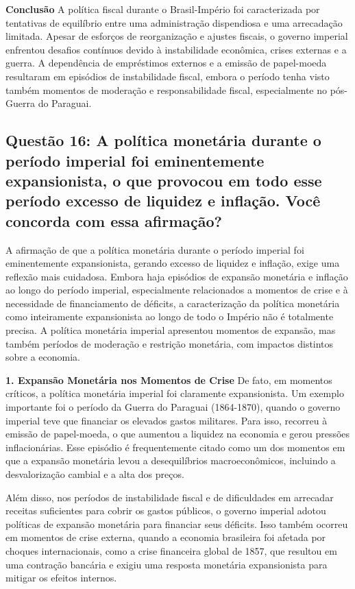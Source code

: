 \documentclass[a4paper,12pt]{article}[abntex2]
\begin{document}
\textbf{Conclusão}
A política fiscal durante o Brasil-Império foi caracterizada por tentativas de equilíbrio entre uma administração dispendiosa e uma arrecadação limitada. Apesar de esforços de reorganização e ajustes fiscais, o governo imperial enfrentou desafios contínuos devido à instabilidade econômica, crises externas e a guerra. A dependência de empréstimos externos e a emissão de papel-moeda resultaram em episódios de instabilidade fiscal, embora o período tenha visto também momentos de moderação e responsabilidade fiscal, especialmente no pós-Guerra do Paraguai.

\subsection{\textbf{Questão 16: A política monetária durante o período imperial foi eminentemente expansionista, o que provocou em todo esse período excesso de liquidez e inflação. Você concorda com essa afirmação?}}

A afirmação de que a política monetária durante o período imperial foi eminentemente expansionista, gerando excesso de liquidez e inflação, exige uma reflexão mais cuidadosa. Embora haja episódios de expansão monetária e inflação ao longo do período imperial, especialmente relacionados a momentos de crise e à necessidade de financiamento de déficits, a caracterização da política monetária como inteiramente expansionista ao longo de todo o Império não é totalmente precisa. A política monetária imperial apresentou momentos de expansão, mas também períodos de moderação e restrição monetária, com impactos distintos sobre a economia.

\textbf{1. Expansão Monetária nos Momentos de Crise}
De fato, em momentos críticos, a política monetária imperial foi claramente expansionista. Um exemplo importante foi o período da Guerra do Paraguai (1864-1870), quando o governo imperial teve que financiar os elevados gastos militares. Para isso, recorreu à emissão de papel-moeda, o que aumentou a liquidez na economia e gerou pressões inflacionárias. Esse episódio é frequentemente citado como um dos momentos em que a expansão monetária levou a desequilíbrios macroeconômicos, incluindo a desvalorização cambial e a alta dos preços.

Além disso, nos períodos de instabilidade fiscal e de dificuldades em arrecadar receitas suficientes para cobrir os gastos públicos, o governo imperial adotou políticas de expansão monetária para financiar seus déficits. Isso também ocorreu em momentos de crise externa, quando a economia brasileira foi afetada por choques internacionais, como a crise financeira global de 1857, que resultou em uma contração bancária e exigiu uma resposta monetária expansionista para mitigar os efeitos internos.
\end{document}
